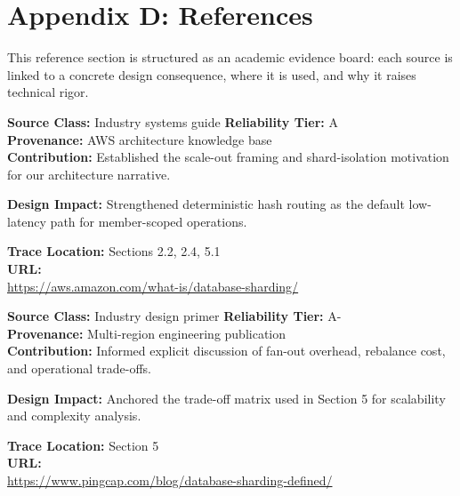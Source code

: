 \documentclass[a4paper,12pt]{article}
\begin{document}
\section{Appendix D: References}

\begin{tcolorbox}[refboard,width=\textwidth,box align=center,title={\faIcon{flask}\ \textbf{Evidence Architecture Board}},fonttitle=\bfseries,coltitle=iitgnblue]
\small
This reference section is structured as an academic evidence board: each source is linked to a concrete design consequence, where it is used, and why it raises technical rigor.
\end{tcolorbox}

\vspace{4pt}
\noindent
\begin{minipage}[t]{0.49\textwidth}
\begin{tcolorbox}[refdossier,title={\faIcon{database}\ \textbf{R1 \ | \ AWS: What Is Database Sharding?}},fonttitle=\bfseries,coltitle=iitgnblue]
\scriptsize
\textbf{Source Class:} Industry systems guide \hfill \textbf{Reliability Tier:} A\\
\textbf{Provenance:} AWS architecture knowledge base\\
\textbf{Contribution:} Established the scale-out framing and shard-isolation motivation for our architecture narrative.\\
\begin{tcolorbox}[refinsight]
\textbf{Design Impact:} Strengthened deterministic hash routing as the default low-latency path for member-scoped operations.
\end{tcolorbox}
\textbf{Trace Location:} Sections 2.2, 2.4, 5.1\\
\textbf{URL:}\\[-2pt]
\url{https://aws.amazon.com/what-is/database-sharding/}
\end{tcolorbox}
\end{minipage}
\hfill
\begin{minipage}[t]{0.49\textwidth}
\begin{tcolorbox}[refdossier,title={\faIcon{route}\ \textbf{R2 \ | \ PingCAP: Database Sharding Defined}},fonttitle=\bfseries,coltitle=iitgnblue]
\scriptsize
\textbf{Source Class:} Industry design primer \hfill \textbf{Reliability Tier:} A-\\
\textbf{Provenance:} Multi-region engineering publication\\
\textbf{Contribution:} Informed explicit discussion of fan-out overhead, rebalance cost, and operational trade-offs.\\
\begin{tcolorbox}[refinsight]
\textbf{Design Impact:} Anchored the trade-off matrix used in Section 5 for scalability and complexity analysis.
\end{tcolorbox}
\textbf{Trace Location:} Section 5\\
\textbf{URL:}\\[-2pt]
\url{https://www.pingcap.com/blog/database-sharding-defined/}
\end{tcolorbox}
\end{minipage}
\end{document}
